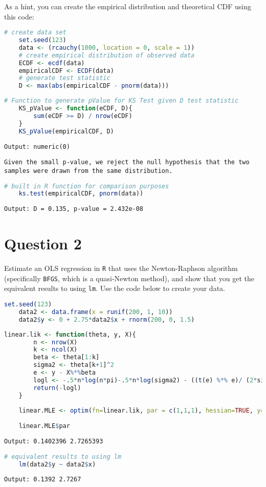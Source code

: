\documentclass[12pt,letterpaper]{article}
\begin{document}
	
\noindent As a hint, you can create the empirical distribution and theoretical CDF using this code:

\begin{lstlisting}[language=R]
	# create data set
	set.seed(123)
	data <- (rcauchy(1000, location = 0, scale = 1))
	# create empirical distribution of observed data
	ECDF <- ecdf(data)
	empiricalCDF <- ECDF(data)
	# generate test statistic
	D <- max(abs(empiricalCDF - pnorm(data))) \end{lstlisting}
\vspace{2cm}

\begin{lstlisting}[language=R]
	# Function to generate pValue for KS Test given D test statistic
	KS_pValue <- function(eCDF, D){
		sum(eCDF >= D) / nrow(eCDF)
	}
	KS_pValue(empiricalCDF, D) \end{lstlisting}
\vspace{.25cm}
\texttt{Output: numeric(0)}
\vspace{.25cm}

\noindent\texttt{Given the small p-value, we reject the null hypothesis that the two samples were drawn from the same distribution.}
\vspace{.5cm}
\begin{lstlisting}[language=R]
	# built in R function for comparison purposes
	ks.test(empiricalCDF, pnorm(data)) \end{lstlisting}
\vspace{.25cm}
\texttt{Output: D = 0.135, p-value = 2.432e-08}
\newpage
\section*{Question 2}
\noindent Estimate an OLS regression in \texttt{R} that uses the Newton-Raphson algorithm (specifically \texttt{BFGS}, which is a quasi-Newton method), and show that you get the equivalent results to using \texttt{lm}. Use the code below to create your data.
\vspace{.5cm}
\begin{lstlisting}[language=R]
	set.seed(123)
	data2 <- data.frame(x = runif(200, 1, 10)) 
	data2$y <- 0 + 2.75*data2$x + rnorm(200, 0, 1.5) \end{lstlisting}
\vspace{1cm}
\begin{lstlisting}[language=R]
	linear.lik <- function(theta, y, X){
		n <- nrow(X)
		k <- ncol(X)
		beta <- theta[1:k]
		sigma2 <- theta[k+1]^2
		e <- y - X%*%beta
		logl <- -.5*n*log(n*pi)-.5*n*log(sigma2) - ((t(e) %*% e)/ (2*sigma2))
		return(-logl)
	}
	
	linear.MLE <- optim(fn=linear.lik, par = c(1,1,1), hessian=TRUE, y=data2$y, X=cbind(1, data2$x), method = "BFGS")
	
	linear.MLE$par \end{lstlisting}
\vspace{.5cm}
\texttt{Output: 0.1402396  2.7265393}
\vspace{1cm}
\begin{lstlisting}[language=R]
	# equivalent results to using lm
	lm(data2$y ~ data2$x)\end{lstlisting}
\vspace{.5cm}
\texttt{Output: 0.1392       2.7267}
\end{document}
